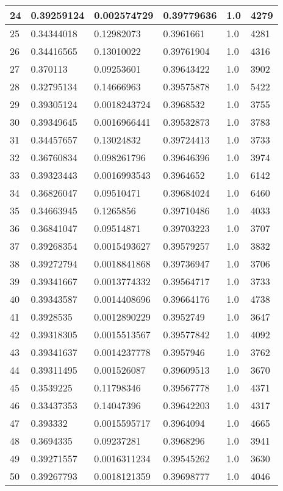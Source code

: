\begin{longtable}{|l|l|l|l|l|l|}
24 & 0.39259124 & 0.002574729 & 0.39779636 & 1.0 & 4279 \\ \hline 
25 & 0.34344018 & 0.12982073 & 0.3961661 & 1.0 & 4281 \\ \hline 
26 & 0.34416565 & 0.13010022 & 0.39761904 & 1.0 & 4316 \\ \hline 
27 & 0.370113 & 0.09253601 & 0.39643422 & 1.0 & 3902 \\ \hline 
28 & 0.32795134 & 0.14666963 & 0.39575878 & 1.0 & 5422 \\ \hline 
29 & 0.39305124 & 0.0018243724 & 0.3968532 & 1.0 & 3755 \\ \hline 
30 & 0.39349645 & 0.0016966441 & 0.39532873 & 1.0 & 3783 \\ \hline 
31 & 0.34457657 & 0.13024832 & 0.39724413 & 1.0 & 3733 \\ \hline 
32 & 0.36760834 & 0.098261796 & 0.39646396 & 1.0 & 3974 \\ \hline 
33 & 0.39323443 & 0.0016993543 & 0.3964652 & 1.0 & 6142 \\ \hline 
34 & 0.36826047 & 0.09510471 & 0.39684024 & 1.0 & 6460 \\ \hline 
35 & 0.34663945 & 0.1265856 & 0.39710486 & 1.0 & 4033 \\ \hline 
36 & 0.36841047 & 0.09514871 & 0.39703223 & 1.0 & 3707 \\ \hline 
37 & 0.39268354 & 0.0015493627 & 0.39579257 & 1.0 & 3832 \\ \hline 
38 & 0.39272794 & 0.0018841868 & 0.39736947 & 1.0 & 3706 \\ \hline 
39 & 0.39341667 & 0.0013774332 & 0.39564717 & 1.0 & 3733 \\ \hline 
40 & 0.39343587 & 0.0014408696 & 0.39664176 & 1.0 & 4738 \\ \hline 
41 & 0.3928535 & 0.0012890229 & 0.3952749 & 1.0 & 3647 \\ \hline 
42 & 0.39318305 & 0.0015513567 & 0.39577842 & 1.0 & 4092 \\ \hline 
43 & 0.39341637 & 0.0014237778 & 0.3957946 & 1.0 & 3762 \\ \hline 
44 & 0.39311495 & 0.001526087 & 0.39609513 & 1.0 & 3670 \\ \hline 
45 & 0.3539225 & 0.11798346 & 0.39567778 & 1.0 & 4371 \\ \hline 
46 & 0.33437353 & 0.14047396 & 0.39642203 & 1.0 & 4317 \\ \hline 
47 & 0.393332 & 0.0015595717 & 0.3964094 & 1.0 & 4665 \\ \hline 
48 & 0.3694335 & 0.09237281 & 0.3968296 & 1.0 & 3941 \\ \hline 
49 & 0.39271557 & 0.0016311234 & 0.39545262 & 1.0 & 3630 \\ \hline 
50 & 0.39267793 & 0.0018121359 & 0.39698777 & 1.0 & 4046 \\ \hline 
\end{longtable}